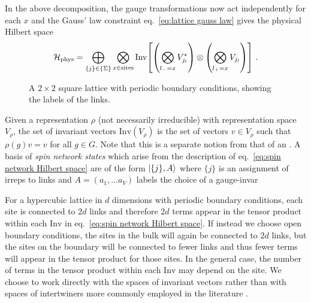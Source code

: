 In the above decomposition, the gauge transformations now act independently for each $x$ and the Gauss' law constraint eq.~\eqref{eq:lattice gauss law} gives the physical Hilbert space
\begin{equation}
    \label{eq:spin network Hilbert space}
    \mathcal{H}_{\mathrm{phys}} = \bigoplus_{\{j\} \in \{\Sigma\}} \bigotimes_{x \in \mathrm{sites}} \mathrm{Inv}\bqty{\pqty{\bigotimes_{l_-=x} V_{j_l}^*} \otimes \pqty{\bigotimes_{l_+=x} V_{j_l} }} \ .
\end{equation}
\begin{wrapfigure}{r}{0.4\textwidth}
    \centering
    \caption{A $2\times 2$ square lattice with periodic boundary conditions, showing the labels of the links.}
    \label{fig:periodic plaquette}
    \vspace{-2em}
\end{wrapfigure}
Given a representation $\rho$ (not necessarily irreducible) with representation space $V_\rho$, the set of invariant vectors $\mathrm{Inv}(V_\rho)$ is the set of vectors $v \in V_\rho$ such that $\rho(g) v = v$ for all $g\in G$.
Note that this is a separate notion from that of an .
A basis of \textit{spin network states} which arise from the description of eq.~\eqref{eq:spin network Hilbert space} are of the form $\ket{\{j\},A}$ where $\{j\}$ is an assignment of irreps to links and $A=(a_1, \ldots a_V)$ labels the choice of a gauge-invar


For a hypercubic lattice in $d$ dimensions with periodic boundary conditions, each site is connected to $2d$ links and therefore $2d$ terms appear in the tensor product within each $\mathrm{Inv}$ in eq.~\eqref{eq:spin network Hilbert space}.
If instead we choose open boundary conditions, the sites in the bulk will again be connected to $2d$ links, but the sites on the boundary will be connected to fewer links and thus fewer terms will appear in the tensor product for those sites.
In the general case, the number of terms in the tensor product within each $\mathrm{Inv}$ may depend on the site.
We choose to work directly with the spaces of invariant vectors rather than with spaces of intertwiners more commonly employed in the literature \cite{Baez, Burgio}.

